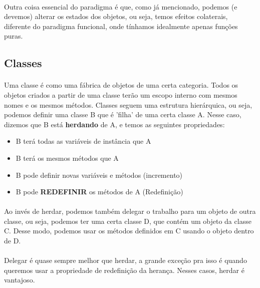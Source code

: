 \documentclass[11pt]{article}
\begin{document}
\paragraph{} Outra coisa essencial do paradigma é que, como já mencionado, podemos (e devemos) alterar os estados dos objetos, ou seja,
temos efeitos colaterais, diferente do paradigma funcional, onde tínhamos idealmente apenas funções puras.

\subsection{Classes}
\label{sec:org12e6e45}
\paragraph{} Uma classe é como uma fábrica de objetos de uma certa categoria. Todos os objetos criados a partir de uma classe terão um
escopo interno com mesmos nomes e os mesmos métodos. Classes seguem uma estrutura hierárquica, ou seja, podemos definir uma classe B que é
'filha' de uma certa classe A. Nesse caso, dizemos que B está \textbf{herdando} de A, e temos as seguintes propriedades:

\begin{itemize}
\item B terá todas as variáveis de instância que A
\item B terá os mesmos métodos que A
\item B pode definir novas variáveis e métodos (incremento)
\item B pode \textbf{REDEFINIR} os métodos de A (Redefinição)
\end{itemize}

\paragraph{} Ao invés de herdar, podemos também delegar o trabalho para um objeto de outra classe, ou seja, podemos ter uma certa classe
D, que contém um objeto da classe C. Desse modo, podemos usar os métodos definidos em C usando o objeto dentro de D.

\paragraph{} Delegar é quase sempre melhor que herdar, a grande exceção pra isso é quando queremos usar a propriedade de redefinição da
herança. Nesses casos, herdar é vantajoso.
\end{document}
